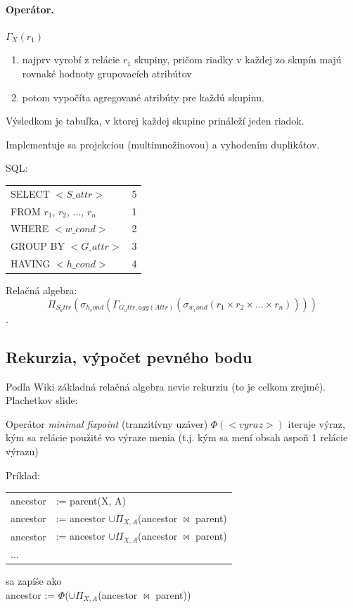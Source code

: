 \documentclass[10pt,a4paper]{article}
\begin{document}
\paragraph{Operátor.}
$\Gamma_X(r_1)$
\begin{enumerate}
\item najprv vyrobí z relácie $r_1$ skupiny, pričom riadky v každej zo
skupín majú rovnaké hodnoty grupovacích atribútov
\item potom vypočíta agregované atribúty pre každú skupinu.
\end{enumerate}
Výsledkom je tabuľka, v ktorej každej skupine prináleží jeden
riadok.

Implementuje sa projekciou (multimnožinovou) a vyhodením duplikátov.

SQL:
\begin{tabular}{lc}
SELECT $<S\_attr>$ & 5 \\
FROM $r_1$, $r_2$, ..., $r_n$ & 1 \\
WHERE $<w\_cond>$ & 2 \\
GROUP BY $<G\_attr>$ & 3 \\
HAVING $<h\_cond>$ & 4 \\
\end{tabular}

Relačná algebra:
$$\Pi_{S_attr}(\sigma_{h_cond}(\Gamma_{G_attr, agg(Attr)}(\sigma_{w_cond}(r_1 \times r_2 \times \ldots \times r_n))))$$.


\subsection{Rekurzia, výpočet pevného bodu}

Podľa Wiki základná relačná algebra nevie rekurziu (to je celkom zrejmé).
Plachetkov slide:

Operátor \emph{minimal fixpoint} (tranzitívny uzáver) $\Phi(<vyraz>)$ iteruje výraz, kým sa relácie použité vo výraze
menia (t.j. kým sa mení obsah aspoň 1 relácie výrazu)

Príklad:
\begin{tabular}{ll}
ancestor &:= parent(X, A) \\
ancestor &:= ancestor $\cup \Pi_{X,A}$(ancestor $\Join$ parent) \\
ancestor &:= ancestor $\cup \Pi_{X,A}$(ancestor $\Join$ parent) \\
... & \\
\end{tabular}
sa zapíše ako\\
ancestor := $\Phi$($\cup \Pi_{X,A}$(ancestor $\Join$ parent)) \\
\end{document}
